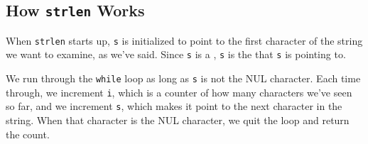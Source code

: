 \subsection{How {\tt strlen} Works}

When {\tt strlen} starts up, {\tt s} is initialized to point to the
first character of the string we want to examine, as we've said.
Since {\tt s} is a \Char, {\tt *s} is the \chr that {\tt s} is
pointing to.  

We run through the {\tt while} loop as long as {\tt *s} is not the NUL
character.  Each time through, we increment {\tt i}, which is a counter
of how many characters we've seen so far, and we increment {\tt s},
which makes it point to the next character in the string.  When that
character is the NUL character, we quit the loop and return the count.



